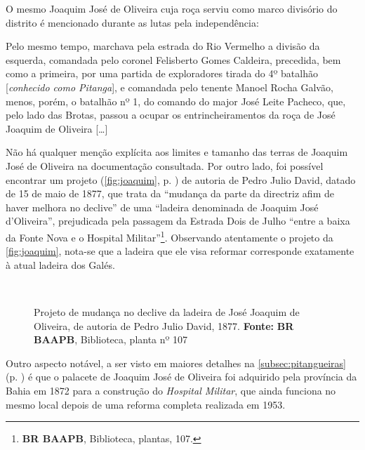 O mesmo Joaquim José de Oliveira cuja roça serviu como marco divisório do distrito é mencionado durante as lutas pela independência:

\begin{citacao}
Pelo mesmo tempo, marchava pela estrada do Rio Vermelho a divisão da esquerda, comandada pelo coronel Felisberto Gomes Caldeira, precedida, bem como a primeira, por uma partida de exploradores tirada do 4º batalhão [\textit{conhecido como Pitanga}], e comandada pelo tenente Manoel Rocha Galvão, menos, porém, o batalhão nº 1, do comando do major José Leite Pacheco, que, pelo lado das Brotas, passou a ocupar os entrincheiramentos da roça de José Joaquim de Oliveira [\dots] \cite[p.~58]{vieira_memorias_1903}
\end{citacao}

Não há qualquer menção explícita aos limites e tamanho das terras de Joaquim José de Oliveira na documentação consultada. Por outro lado, foi possível encontrar um projeto (\autoref{fig:joaquim}, p. \pageref{fig:joaquim}) de autoria de Pedro Julio David, datado de 15 de maio de 1877, que trata da ``mudança da parte da directriz afim de haver melhora no declive'' de uma ``ladeira denominada de Joaquim José d'Oliveira'', prejudicada pela passagem da Estrada Dois de Julho ``entre a baixa da Fonte Nova e o Hospital Militar''\footnote{\textbf{BR BAAPB}, Biblioteca, plantas, 107.}. Observando atentamente o projeto da \autoref{fig:joaquim}, nota-se que a ladeira que ele visa reformar corresponde exatamente à atual ladeira dos Galés.

\begin{figure}[!htp]
\centering
{}
\  %
\  %
\caption{Projeto de mudança no declive da ladeira de José Joaquim de Oliveira, de autoria de Pedro Julio David, 1877. \textbf{Fonte:} \textbf{BR BAAPB}, Biblioteca, planta nº 107}
\label{fig:joaquim}
\end{figure}

Outro aspecto notável, a ser visto em maiores detalhes na \autoref{subsec:pitangueiras} (p. \pageref{subsec:pitangueiras}) é que o palacete de Joaquim José de Oliveira foi adquirido pela província da Bahia em 1872 para a construção do \textit{Hospital Militar}, que ainda funciona no mesmo local depois de uma reforma completa realizada em 1953.

